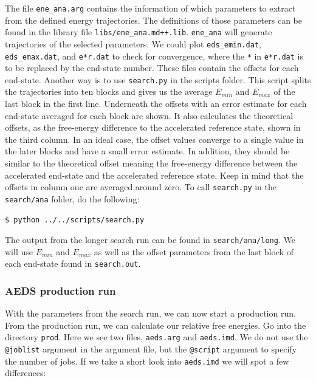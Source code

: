 The file \texttt{ene\_ana.arg} contains the information of which parameters to extract from the defined energy trajectories. The definitions of those parameters can be found in the library file \texttt{libs/ene\_ana.md++.lib}. \texttt{ene\_ana} will generate trajectories of the selected parameters. We could plot \texttt{eds\_emin.dat}, \texttt{eds\_emax.dat}, and \texttt{e*r.dat} to check for convergence, where the \texttt{*} in \texttt{e*r.dat} is to be replaced by the end-state number. These files contain the offsets for each end-state. Another way is to use \texttt{search.py} in the scripts folder. This script splits the trajectories into ten blocks and gives us the average $E_{min}$ and $E_{max}$ of the last block in the first line. Underneath the offsets with an error estimate for each end-state averaged for each block are shown. It also calculates the theoretical offsets, as the free-energy difference to the accelerated reference state, shown in the third column. In an ideal case, the offset values converge to a single value in the later blocks and have a small error estimate. In addition, they should be similar to the theoretical offset meaning the free-energy difference between the accelerated end-state and the accelerated reference state. Keep in mind that the offsets in column one are averaged around zero.
To call \texttt{search.py} in the \texttt{search/ana} folder, do the following:

\begin{lstlisting}
$ python ../../scripts/search.py
\end{lstlisting}

The output from the longer search run can be found in \texttt{search/ana/long}.
We will use $E_{min}$ and $E_{max}$ as well as the offset parameters from the last block of each end-state found in \texttt{search.out}.

\subsubsection{AEDS production run}
With the parameters from the search run, we can now start a production run. From the production run, we can calculate our relative free energies. Go into the directory \texttt{prod}. Here we see two files, \texttt{aeds.arg} and \texttt{aeds.imd}. We do not use the \texttt{@joblist} argument in the argument file, but the \texttt{@script} argument to specify the number of jobs. If we take a short look into \texttt{aeds.imd} we will spot a few differences:

